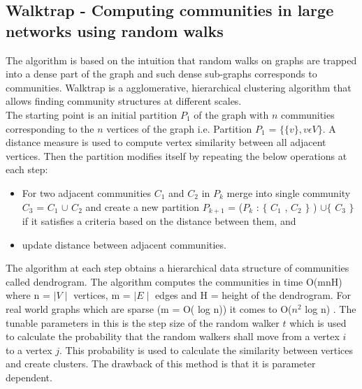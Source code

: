 \subsection{Walktrap - Computing communities in large networks using random walks}
The algorithm is based on the intuition that random walks on graphs are trapped into a dense part of the graph and such dense sub-graphs corresponds to communities. Walktrap is a agglomerative, hierarchical clustering algorithm that allows finding community structures at different scales. \\

The starting point is an initial partition $P_1$ of the graph with $n$ communities corresponding to the $n$ vertices of the graph i.e.   
Partition $P_1$ = $\lbrace\lbrace v \rbrace, v \epsilon V \rbrace$. A distance measure is used to compute vertex similarity between all adjacent vertices. Then the partition modifies itself by repeating the below operations at each step:\\

\begin{itemize}
\item For two adjacent communities $C_1$ and $C_2$ in $P_k$ merge into single community $C_3$ = $C_1$ $\cup$ $C_2$ and create a new partition $P_{k+1}$ = ($P_k$ : $\lbrace$ $C_1$ , $C_2$ $\rbrace$ ) $\cup \lbrace$ $C_3$ $\rbrace$ if it satisfies a criteria based on the distance between them, and
\item update distance between adjacent communities.\\
\end{itemize}

The algorithm at each step obtains a hierarchical data structure of communities called dendrogram. The algorithm computes the communities in time O(mnH) where n = $\mid V \mid$ vertices, m = $\mid E \mid$ edges and H = height of the dendrogram. For real world graphs which are sparse (m = O( log n)) it comes to O($n^2$ log n) \cite{aps:29}. The tunable parameters in this is the step size of the random walker $t$ which is used to calculate the probability that the random walkers shall move from a vertex $i$ to a vertex $j$. This probability is used to calculate the similarity between vertices and create clusters. The drawback of this method is that it is parameter dependent.\\ 

